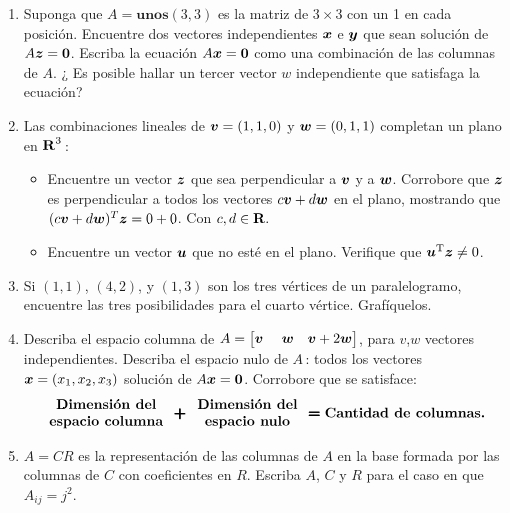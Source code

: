 \documentclass[12pt,a4paper]{article}
\newcommand{\bi}[1]{\hbox{\boldmath$#1$}}
\newcommand\1{\mbox{\,\vrule height-0.8pt depth1.0pt width2pc\,}}
\newcommand\2{\mbox{\,\vrule height-0.8pt depth1.0pt width1pc\,}}
\begin{document}
\begin{enumerate}
\item  Suponga que $A=\textbf{unos}(3,3)$ es la matriz de $3 \times 3$ con un 1 en cada posición. Encuentre dos vectores independientes $\bi{x}$ e $\bi{y}$ que sean solución de $A\bi{z} = \bi{0}$. Escriba la ecuación $A\bi{x}= \bi{0}$ como una combinación de las columnas de $A$. ¿ Es posible hallar un tercer vector \bi{w} independiente que satisfaga la ecuación?

\item Las combinaciones lineales de $\bi{v}=(1,1,0)$ y $\bi{w}=(0,1,1)$ completan un plano en $\hbox{\textbf{R}}^{3}$\,:

\begin{itemize}
\item[(a)] Encuentre un vector $\bi{z}$ que sea perpendicular a $\bi{v}$ y a $\bi{w}$.
Corrobore que $\bi{z}$ es perpendicular a todos los vectores $c\bi{v}+d\bi{w}$ en el plano, mostrando que ${(c\bi{v}+d\bi{w})^{T}\bi{z}=0+0}$. Con $c,d \in  \hbox{\textbf{R}}.$

\item[(b)] Encuentre un vector $\bi{u}$ que no esté en el plano. Verifique que $\bi{u}^{\mathrm{T}}\bi{z}\neq 0$.

\end{itemize}

\item Si  $(1, 1)$, $(4, 2)$, y $(1, 3)$ son los tres vértices de un paralelogramo, encuentre las tres posibilidades para el cuarto vértice. Grafíquelos.


\item Describa el espacio columna de $A=\begin{bmatrix} \bi{v}\ & \bi{w} & \bi{v}+2\bi{w}\end{bmatrix}$, para \bi{v},\bi{w} vectores independientes.
Describa el espacio nulo de $A$\,: todos los vectores $\bi{x}=(x_{1}, x_{2}, x_{3})$ solución de $A\bi{x}=\bi{0}$. Corrobore que se satisface:
\[
\begin{array}{c}\textbf{Dimensión del} \\ \textbf{espacio columna} \end{array} \;\bi{\pmb{+}}\; \begin{array}{c}\textbf{Dimensión del} \\\textbf{espacio nulo}\end{array}
\;\bi{\pmb{=}}\; \textbf{Cantidad de columnas.}
\]


\item  $A=CR$ es la representación de las columnas de $A$ en la base formada por las columnas de $C$ con coeficientes en $R$. Escriba $A$, $C$ y $R$ para el caso en que $A_{ij} = j^{2}$.



\end{enumerate}
\end{document}
